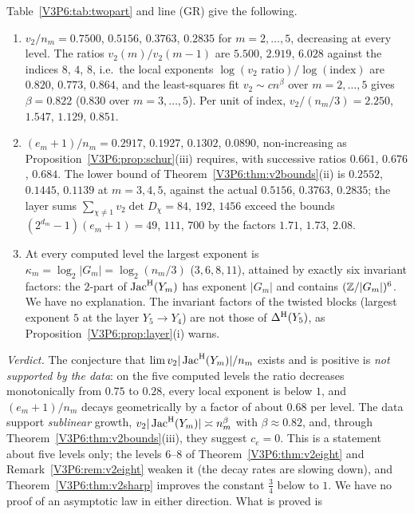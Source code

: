 \begin{remark}\label{V3P6:rem:v2verdict}
Table~\ref{V3P6:tab:twopart} and line (GR) give the following.
\begin{enumerate}
\item[(a)] $v_2/n_m=0.7500$, $0.5156$, $0.3763$, $0.2835$ for $m=2,\dots,5$, decreasing at
every level. The ratios $v_2(m)/v_2(m-1)$ are $5.500$, $2.919$, $6.028$ against the indices
$8$, $4$, $8$, i.e.\ the local exponents $\log(v_2\text{ ratio})/\log(\text{index})$ are
$0.820$, $0.773$, $0.864$, and the least-squares fit $v_2\sim cn^{\beta}$ over $m=2,\dots,5$
gives $\beta=0.822$ ($0.830$ over $m=3,\dots,5$). Per unit of index, $v_2/(n_m/3)=2.250$,
$1.547$, $1.129$, $0.851$.
\item[(b)] $(e_m+1)/n_m=0.2917$, $0.1927$, $0.1302$, $0.0890$, non-increasing as
Proposition~\ref{V3P6:prop:schur}(iii) requires, with successive ratios $0.661$, $0.676$,
$0.684$. The lower bound of Theorem~\ref{V3P6:thm:v2bounds}(ii) is $0.2552$, $0.1445$, $0.1139$
at $m=3,4,5$, against the actual $0.5156$, $0.3763$, $0.2835$; the layer sums
$\sum_{\chi\ne1}v_2\det D_\chi=84$, $192$, $1456$ exceed the bounds $(2^{d_m}-1)(e_m+1)=49$,
$111$, $700$ by the factors $1.71$, $1.73$, $2.08$.
\item[(c)] At every computed level the largest exponent is $\kappa_m=\log_2|G_m|=\log_2(n_m/3)$
($3,6,8,11$), attained by exactly six invariant factors: the $2$-part of $\operatorname{Jac}^{\mathrm{H}}(Y_m)$ has
exponent $|G_m|$ and contains $(\mathbb{Z}/|G_m|)^{6}$. We have no explanation. The invariant factors of
the twisted blocks (largest exponent $5$ at the layer $Y_5\to Y_4$) are not those of
$\Delta^{\mathrm{H}}(Y_5)$, as Proposition~\ref{V3P6:prop:layer}(i) warns.
\end{enumerate}
\emph{Verdict.} The conjecture that $\lim v_2|\operatorname{Jac}^{\mathrm{H}}(Y_m)|/n_m$ exists and is positive is
\emph{not supported by the data}: on the five computed levels the ratio decreases monotonically
from $0.75$ to $0.28$, every local exponent is below $1$, and $(e_m+1)/n_m$ decays geometrically
by a factor of about $0.68$ per level. The data support \emph{sublinear} growth,
$v_2|\operatorname{Jac}^{\mathrm{H}}(Y_m)|\asymp n_m^{\beta}$ with $\beta\approx0.82$, and, through
Theorem~\ref{V3P6:thm:v2bounds}(iii), they suggest $c_e=0$. This is a statement about five
levels only; the levels $6$--$8$ of Theorem~\ref{V3P6:thm:v2eight} and
Remark~\ref{V3P6:rem:v2eight} weaken it (the decay rates are slowing down), and
Theorem~\ref{V3P6:thm:v2sharp} improves the constant $\frac34$ below to $1$. We have no proof of an asymptotic law in either direction. What is proved is

\end{remark}
